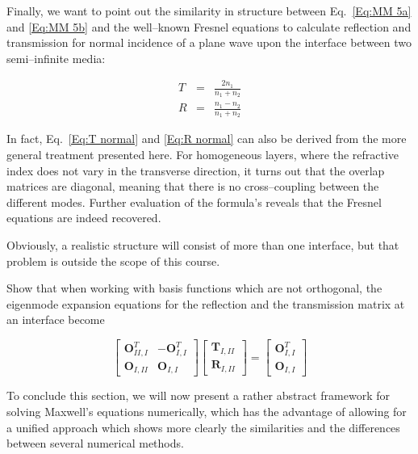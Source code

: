 Finally, we want to point out the similarity in structure between Eq.~\ref{Eq:MM 5a}
and \ref{Eq:MM 5b} and the well--known Fresnel equations to calculate reflection
and transmission for normal incidence of a plane wave upon the interface between
two semi--infinite media:

\begin{eqnarray}
T & = & \frac{2n_{1}}{n_{1}+n_{2}}\label{Eq:T normal} \\
R & = & \frac{n_{1}-n_{2}}{n_{1}+n_{2}}\label{Eq:R normal} 
\end{eqnarray}

In fact, Eq.~\ref{Eq:T normal} and \ref{Eq:R normal} can also be derived
from the more general treatment presented here. For homogeneous layers, where
the refractive index does not vary in the transverse direction, it turns out
that the overlap matrices are diagonal, meaning that there is no cross--coupling
between the different modes. Further evaluation of the formula's reveals that
the Fresnel equations are indeed recovered.

Obviously, a realistic structure will consist of more than one interface, but that problem is outside the scope of this course.


\begin{exer}
Show that when working with basis functions which are not orthogonal, the eigenmode expansion equations for the reflection and the transmission matrix at an interface become

$$ \begin{bmatrix} \mathbf{O}^{T}_{II,I} & -\mathbf{O}^{T}_{I,I} \\ \mathbf{O}_{I,II} & \mathbf{O}_{I,I} \end{bmatrix} \begin{bmatrix} \mathbf{T}_{I,II} \\ \mathbf{R}_{I,II} \end{bmatrix} =  \begin{bmatrix} \mathbf{O}^{T}_{I,I} \\ \mathbf{O}_{I,I} \end{bmatrix} $$

\end{exer}


\pagebreak



To conclude this section, we will now present a rather abstract framework for solving Maxwell's equations numerically, which has the advantage of allowing for a unified approach which shows more clearly the similarities and the differences between several numerical methods.

